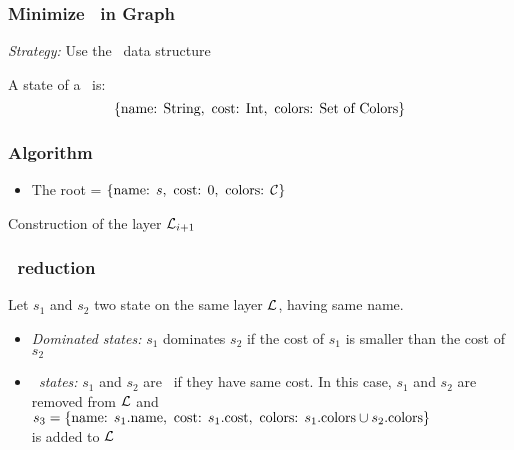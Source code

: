 \begin{frame}
  \frametitle{Minimize \ in Graph}

  \textit{Strategy:} Use the \mdd\ data structure

  \mysep{}

  A state of a \mdd\ is:
  $$\{\text{name: } \text{String}, \text{ cost: } \text{Int}, \text{ colors: } \text{Set of Colors} \}$$

\end{frame}

\begin{frame}[fragile]
  \frametitle{Algorithm}


  \begin{itemize}
    \item The root = $\{\text{name: } s, \text{ cost: } 0, \text{ colors: } \mathcal{C} \}$
  \end{itemize}
  \begin{algorithm}[H]
    \caption{Construction of the layer $\mathcal{L}_{i+1}$}
  \end{algorithm}

\end{frame}

\begin{frame}
  \frametitle{\mdd\ reduction}

  Let $s_1$ and $s_2$ two state on the same layer $\mathcal{L}$, having same name.

  \begin{itemize}
    \item \textit{Dominated states:} $s_1$ dominates $s_2$ if the cost of $s_1$ is smaller than the cost of $s_2$
    \item \textit{\compatibleState\ states:} $s_1$ and $s_2$ are \compatibleState\ if they have same cost. In this case, $s_1$ and $s_2$ are removed from $\mathcal{L}$ and \\
          \small{$s_3 = \{\text{name: } s_1\text{.name}, \text{ cost: } s_1.\text{cost}, \text{ colors: } s_1\text{.colors} \cup s_2\text{.colors} \}$}\\
          is added to $\mathcal{L}$
  \end{itemize}
\end{frame}


